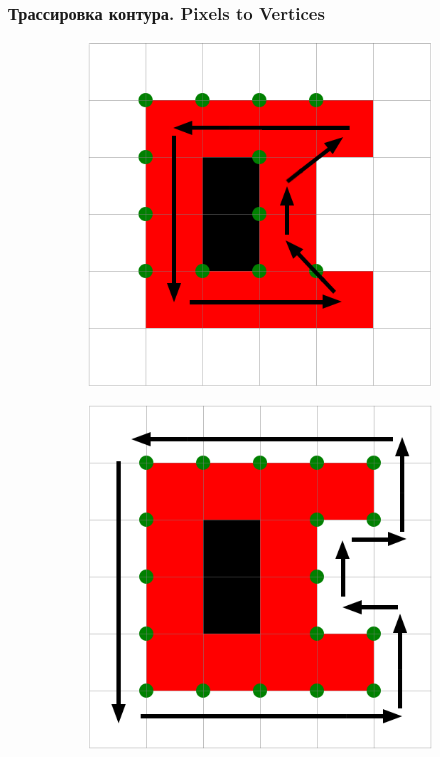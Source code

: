 \documentclass[10pt, unicode]{beamer}
\begin{document}
    \begin{frame}
        \frametitle{Трассировка контура. Pixels to Vertices}
        \begin{figure}[H]
            \centering
            \begin{subfigure}[l]{0.50\linewidth}
                \centering
                \includegraphics[scale=0.35]{SuzukiExample2_uvs.png}
            \end{subfigure}
            \begin{subfigure}{0.49\linewidth}
                \centering
                \includegraphics[scale=0.35]{SuzukiExample2_wanted_uvs.png}
            \end{subfigure}
        \end{figure}
    \end{frame}
\end{document}
